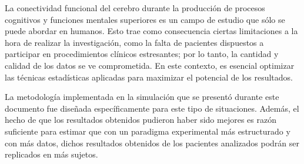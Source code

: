 \documentclass[jou]{apa6}
\begin{document}
La conectividad funcional del cerebro durante la producción de procesos cognitivos y funciones mentales superiores es 
un campo de estudio que sólo se puede abordar en humanos. Esto trae como consecuencia ciertas limitaciones a la hora 
de realizar la investigación, como la falta de pacientes dispuestos a participar en procedimientos clínicos estresantes; 
por lo tanto, la cantidad y calidad de los datos se ve comprometida. En este contexto, es esencial optimizar las 
técnicas estadísticas aplicadas para maximizar el potencial de los resultados.

La metodología implementada en la simulación que se presentó durante este documento fue diseñada específicamente para este 
tipo de situaciones. Además, el hecho de que los resultados obtenidos pudieron haber sido mejores es razón suficiente 
para estimar que con un paradigma experimental más estructurado y con más datos, dichos resultados obtenidos de los 
pacientes analizados podrán ser replicados en más sujetos.

\printbibliography
\end{document}
